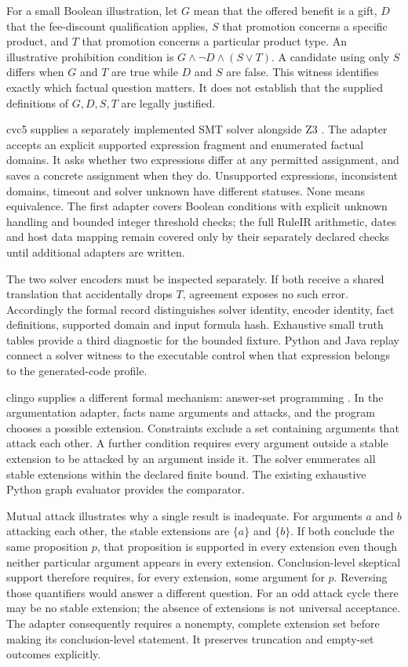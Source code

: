 \documentclass[12pt,a4paper,oneside,openany]{book}
\begin{document}
For a small Boolean illustration, let $G$ mean that the offered benefit is a
gift, $D$ that the fee-discount qualification applies, $S$ that promotion concerns
a specific product, and $T$ that promotion concerns a particular product type.
An illustrative prohibition condition is $G\land\neg D\land(S\lor T)$. A
candidate using only $S$ differs when $G$ and $T$ are true while $D$ and $S$ are
false. This witness identifies exactly which factual question matters. It does
not establish that the supplied definitions of $G,D,S,T$ are legally justified.

cvc5 supplies a separately implemented SMT solver alongside Z3
\citep{cvc5software}. The adapter accepts an explicit supported expression
fragment and enumerated factual domains. It asks whether two expressions differ
at any permitted assignment, and saves a concrete assignment when they do.
Unsupported expressions, inconsistent domains, timeout and solver unknown have
different statuses. None means equivalence. The first adapter covers Boolean
conditions with explicit unknown handling and bounded integer threshold checks;
the full RuleIR arithmetic, dates and host data mapping remain covered only by
their separately declared checks until additional adapters are written.

The two solver encoders must be inspected separately. If both receive a shared
translation that accidentally drops $T$, agreement exposes no such error.
Accordingly the formal record distinguishes solver identity, encoder identity,
fact definitions, supported domain and input formula hash. Exhaustive small
truth tables provide a third diagnostic for the bounded fixture. Python and Java
replay connect a solver witness to the executable control when that expression
belongs to the generated-code profile.

clingo supplies a different formal mechanism: answer-set programming
\citep{clingosoftware}. In the argumentation adapter, facts name arguments and
attacks, and the program chooses a possible extension. Constraints exclude a set
containing arguments that attack each other. A further condition requires every
argument outside a stable extension to be attacked by an argument inside it.
The solver enumerates all stable extensions within the declared finite bound.
The existing exhaustive Python graph evaluator provides the comparator.

Mutual attack illustrates why a single result is inadequate. For arguments $a$
and $b$ attacking each other, the stable extensions are $\{a\}$ and $\{b\}$.
If both conclude the same proposition $p$, that proposition is supported in every
extension even though neither particular argument appears in every extension.
Conclusion-level skeptical support therefore requires, for every extension,
some argument for $p$. Reversing those quantifiers would answer a different
question. For an odd attack cycle there may be no stable extension; the absence
of extensions is not universal acceptance. The adapter consequently requires a
nonempty, complete extension set before making its conclusion-level statement.
It preserves truncation and empty-set outcomes explicitly.
\end{document}
